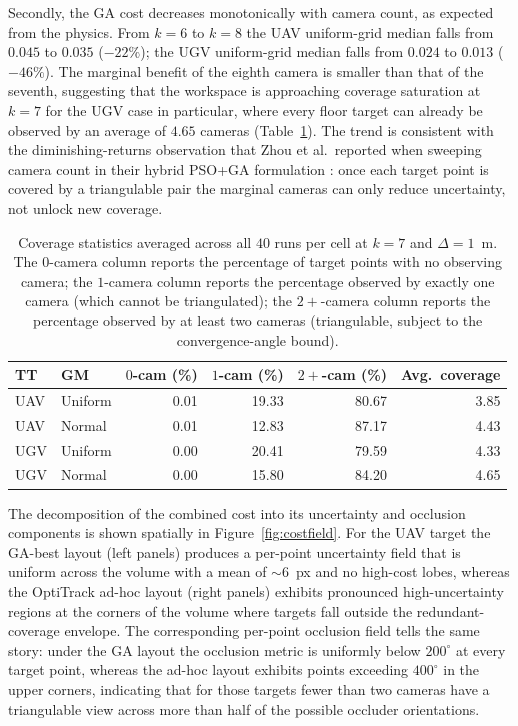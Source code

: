 Secondly, the GA cost decreases monotonically with camera count, as expected from the physics. From $k=6$ to $k=8$ the UAV uniform-grid median falls from $0.045$ to $0.035$ ($-22\%$); the UGV uniform-grid median falls from $0.024$ to $0.013$ ($-46\%$). The marginal benefit of the eighth camera is smaller than that of the seventh, suggesting that the workspace is approaching coverage saturation at $k=7$ for the UGV case in particular, where every floor target can already be observed by an average of $4.65$ cameras (Table~\ref{tab:coverage-stats}). The trend is consistent with the diminishing-returns observation that Zhou et al.\ reported when sweeping camera count in their hybrid PSO+GA formulation \parencite{zhou_sensor_2024}: once each target point is covered by a triangulable pair the marginal cameras can only reduce uncertainty, not unlock new coverage.

\begin{table}[htbp]
\centering
\caption[Per-target-point coverage statistics for the GA-optimised configurations.]{Coverage statistics averaged across all $40$ runs per cell at $k=7$ and $\Delta=1$~m. The $0$-camera column reports the percentage of target points with no observing camera; the $1$-camera column reports the percentage observed by exactly one camera (which cannot be triangulated); the $2{+}$-camera column reports the percentage observed by at least two cameras (triangulable, subject to the convergence-angle bound).}
\label{tab:coverage-stats}
\small
\begin{tabular}{l l r r r r}
\toprule
TT & GM & \multicolumn{1}{c}{$0$-cam (\%)} & \multicolumn{1}{c}{$1$-cam (\%)} & \multicolumn{1}{c}{$2{+}$-cam (\%)} & Avg.\ coverage \\
\midrule
UAV & Uniform & 0.01 & 19.33 & 80.67 & 3.85 \\
UAV & Normal  & 0.01 & 12.83 & 87.17 & 4.43 \\
UGV & Uniform & 0.00 & 20.41 & 79.59 & 4.33 \\
UGV & Normal  & 0.00 & 15.80 & 84.20 & 4.65 \\
\bottomrule
\end{tabular}
\end{table}

The decomposition of the combined cost into its uncertainty and occlusion components is shown spatially in Figure~\ref{fig:costfield}. For the UAV target the GA-best layout (left panels) produces a per-point uncertainty field that is uniform across the volume with a mean of $\sim 6$~px and no high-cost lobes, whereas the OptiTrack ad-hoc layout (right panels) exhibits pronounced high-uncertainty regions at the corners of the volume where targets fall outside the redundant-coverage envelope. The corresponding per-point occlusion field tells the same story: under the GA layout the occlusion metric is uniformly below $200^\circ$ at every target point, whereas the ad-hoc layout exhibits points exceeding $400^\circ$ in the upper corners, indicating that for those targets fewer than two cameras have a triangulable view across more than half of the possible occluder orientations.

